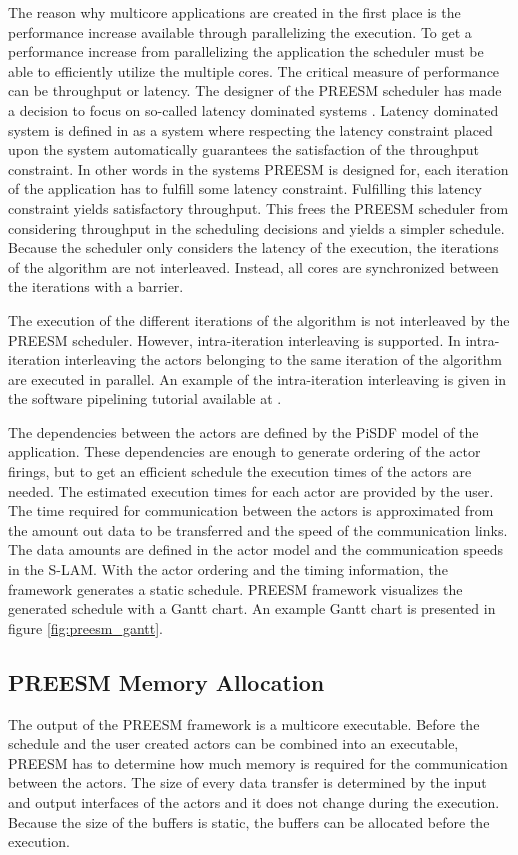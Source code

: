 The reason why multicore applications are created in the first place is the performance increase available through parallelizing the execution. To get a performance increase from parallelizing the application the scheduler must be able to efficiently utilize the multiple cores. The critical measure of performance can be throughput or latency. The designer of the PREESM scheduler has made a decision to focus on so-called latency dominated systems \cite{pelcat2014preesm}. Latency dominated system is defined in \cite{ghamarian2006throughput} as a system where respecting the latency constraint placed upon the system automatically guarantees the satisfaction of the throughput constraint. In other words in the systems PREESM is designed for, each iteration of the application has to fulfill some latency constraint. Fulfilling this latency constraint yields satisfactory throughput. This frees the PREESM scheduler from considering throughput in the scheduling decisions and yields a simpler schedule. Because the scheduler only considers the latency of the execution, the iterations of the algorithm are not interleaved. Instead, all cores are synchronized between the iterations with a barrier.~\cite{pelcat2014preesm}

The execution of the different iterations of the algorithm is not interleaved by the PREESM scheduler. However, intra-iteration interleaving is supported. In intra-iteration interleaving the actors belonging to the same iteration of the algorithm are executed in parallel. \cite{pelcat2014preesm} An example of the intra-iteration interleaving is given in the software pipelining tutorial available at \cite{preesm}.

The dependencies between the actors are defined by the PiSDF model of the application. These dependencies are enough to generate ordering of the actor firings, but to get an efficient schedule the execution times of the actors are needed. The estimated execution times for each actor are provided by the user. The time required for communication between the actors is approximated from the amount out data to be transferred and the speed of the communication links. The data amounts are defined in the actor model and the communication speeds in the S-LAM. With the actor ordering and the timing information, the framework generates a static schedule. \cite{pelcat2014preesm} PREESM framework visualizes the generated schedule with a Gantt chart. An example Gantt chart is presented in figure \ref{fig:preesm_gantt}.

\subsection{PREESM Memory Allocation}
\label{sec:preesm-codegen}
The output of the PREESM framework is a multicore executable. Before the schedule and the user created actors can be combined into an executable, PREESM has to determine how much memory is required for the communication between the actors. The size of every data transfer is determined by the input and output interfaces of the actors and it does not change during the execution. Because the size of the buffers is static, the buffers can be allocated before the execution.~\cite{desnos2012memory}

